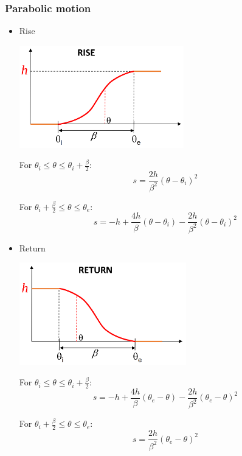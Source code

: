 \documentclass[11pt]{article}
\begin{document}
\subsubsection{Parabolic motion}
\label{sec:orgbd0aa41}
\begin{itemize}
\item Rise
\begin{center}
\includegraphics[height=12em]{./images/formula-method-parabolic-motion-rise-graph.png}
\end{center}

For \(\theta_i \le \theta \le \theta_i + \frac{\beta}{2}\):
\[s = \frac{2h}{\beta^2} (\theta - \theta_i)^2\]

For \(\theta_i + \frac{\beta}{2} \le \theta \le \theta_e\):
\[s = -h + \frac{4h}{\beta} (\theta - \theta_i) - \frac{2h}{\beta^2} (\theta - \theta_i)^2\]

\item Return
\begin{center}
\includegraphics[height=12em]{./images/formula-method-parabolic-motion-return-graph.png}
\end{center}

For \(\theta_i \le \theta \le \theta_i + \frac{\beta}{2}\):
\[s = -h + \frac{4h}{\beta} (\theta_e - \theta) - \frac{2h}{\beta^2} (\theta_e - \theta)^2\]

For \(\theta_i + \frac{\beta}{2} \le \theta \le \theta_e\):
\[s = \frac{2h}{\beta^2} (\theta_e - \theta)^2\]
\end{itemize}
\end{document}
